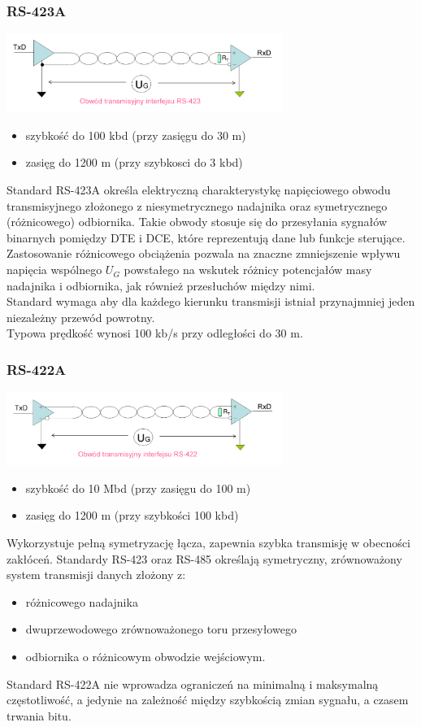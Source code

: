 		\subsubsection{RS-423A}
		\includegraphics[width=9cm]{./wyklady/RS232_12_1.pdf}
		\begin{itemize}
			\item szybkość do 100 kbd (przy zasięgu do 30 m)
			\item zasięg do 1200 m (przy szybkosci do 3 kbd)
		\end{itemize}
		Standard RS-423A określa elektryczną charakterystykę napięciowego obwodu transmisyjnego złożonego z niesymetrycznego nadajnika oraz symetrycznego (różnicowego) odbiornika. Takie obwody stosuje się do przesyłania sygnałów binarnych pomiędzy DTE i DCE, które reprezentują dane lub funkcje sterujące.\\
		Zastosowanie różnicowego obciążenia pozwala na znaczne zmniejszenie wpływu napięcia wspólnego $U_{G}$ powstałego na wskutek różnicy potencjałów masy nadajnika i odbiornika, jak również przesłuchów między nimi.\\
		Standard wymaga aby dla każdego kierunku transmisji istniał przynajmniej jeden niezależny przewód powrotny.\\
		Typowa prędkość wynosi 100 kb/s przy odległości do 30 m.
		\subsubsection{RS-422A}
		\includegraphics[width=9cm]{./wyklady/RS232_12_2.pdf}
		\begin{itemize}
			\item szybkość do 10 Mbd (przy zasięgu do 100 m)
			\item zasięg do 1200 m (przy szybkości 100 kbd)
		\end{itemize}
		Wykorzystuje pełną symetryzację łącza, zapewnia szybka transmisję w obecności zakłóceń. Standardy RS-423 oraz RS-485 określają symetryczny, zrównoważony system transmisji danych złożony z:
		\begin{itemize}
			\item różnicowego nadajnika
			\item dwuprzewodowego zrównoważonego toru przesyłowego
			\item odbiornika o różnicowym obwodzie wejściowym.
		\end{itemize}
		Standard RS-422A nie wprowadza ograniczeń na minimalną i maksymalną częstotliwość, a jedynie na zależność między szybkością zmian sygnału, a czasem trwania bitu.
